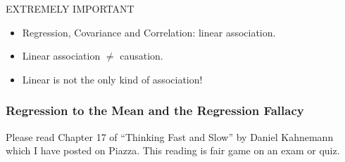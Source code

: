 \begin{frame}

\begin{alertblock}{EXTREMELY IMPORTANT}
	\begin{itemize}
		\item Regression, Covariance and Correlation: linear association.
		\item Linear association $\neq$ causation. 
		\item Linear is not the only kind of association!
	\end{itemize}
\end{alertblock}


\end{frame}

\begin{frame}
  \frametitle{Regression to the Mean and the Regression Fallacy}

  \alert{Please read Chapter 17 of ``Thinking Fast and Slow'' by Daniel Kahnemann which I have posted on Piazza. This reading is fair game on an exam or quiz.}
\end{frame}
\begin{frame}



\end{frame}

%

%
%
%
%
%
%
%
%
%
%
%
%
%
%
%
%
